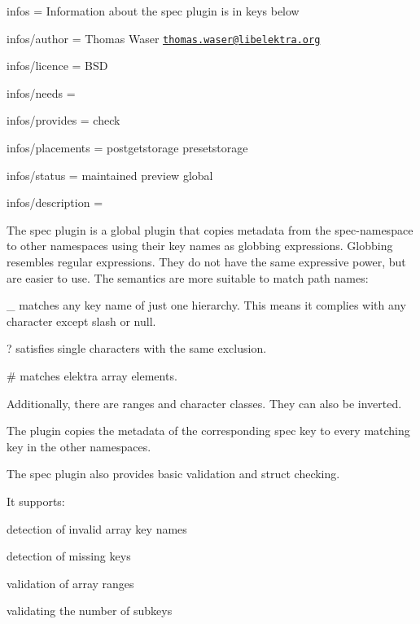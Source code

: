 
\begin{DoxyItemize}
\item infos = Information about the spec plugin is in keys below
\item infos/author = Thomas Waser \href{mailto:thomas.waser@libelektra.org}{\tt thomas.\+waser@libelektra.\+org}
\item infos/licence = B\+S\+D
\item infos/needs =
\item infos/provides = check
\item infos/placements = postgetstorage presetstorage
\item infos/status = maintained preview global
\item infos/description =
\end{DoxyItemize}

The spec plugin is a global plugin that copies metadata from the {\ttfamily spec}-\/namespace to other namespaces using their key names as globbing expressions. Globbing resembles regular expressions. They do not have the same expressive power, but are easier to use. The semantics are more suitable to match path names\+:


\begin{DoxyItemize}
\item \+\_\+ matches any key name of just one hierarchy. This means it complies with any character except slash or null.
\item ? satisfies single characters with the same exclusion.
\item \# matches elektra array elements.
\item Additionally, there are ranges and character classes. They can also be inverted.
\end{DoxyItemize}

The plugin copies the metadata of the corresponding {\ttfamily spec} key to every matching key in the other namespaces.

The spec plugin also provides basic validation and struct checking.

It supports\+:


\begin{DoxyItemize}
\item detection of invalid array key names
\item detection of missing keys
\item validation of array ranges
\item validating the number of subkeys
\end{DoxyItemize}

